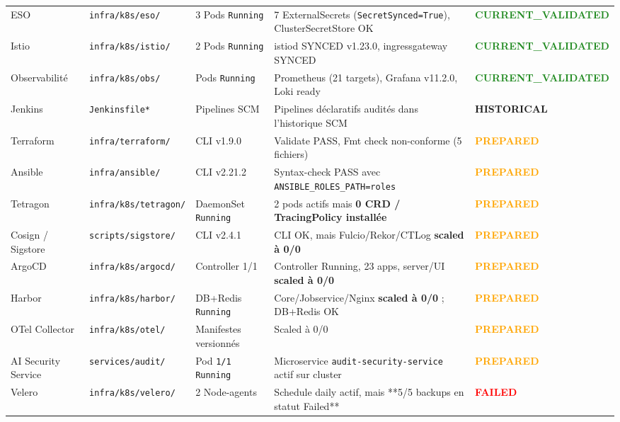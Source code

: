\begin{table}[H]
\begin{tabular}{@{}p{2.6cm}p{2.2cm}p{2.2cm}p{4.8cm}p{2.0cm}@{}}
ESO & \texttt{infra/k8s/eso/} & 3 Pods \texttt{Running} & 7 ExternalSecrets (\texttt{SecretSynced=True}), ClusterSecretStore OK & \textcolor{ForestGreen}{\textbf{CURRENT\_VALIDATED}} \\
Istio & \texttt{infra/k8s/istio/} & 2 Pods \texttt{Running} & istiod SYNCED v1.23.0, ingressgateway SYNCED & \textcolor{ForestGreen}{\textbf{CURRENT\_VALIDATED}} \\
Observabilité & \texttt{infra/k8s/obs/} & Pods \texttt{Running} & Prometheus (21 targets), Grafana v11.2.0, Loki ready & \textcolor{ForestGreen}{\textbf{CURRENT\_VALIDATED}} \\
\midrule
Jenkins & \texttt{Jenkinsfile*} & Pipelines SCM & Pipelines déclaratifs audités dans l'historique SCM & \textcolor{NavyBlue}{\textbf{HISTORICAL}} \\
\midrule
Terraform & \texttt{infra/terraform/} & CLI v1.9.0 & Validate PASS, Fmt check non-conforme (5 fichiers) & \textcolor{orange}{\textbf{PREPARED}} \\
Ansible & \texttt{infra/ansible/} & CLI v2.21.2 & Syntax-check PASS avec \texttt{ANSIBLE\_ROLES\_PATH=roles} & \textcolor{orange}{\textbf{PREPARED}} \\
Tetragon & \texttt{infra/k8s/tetragon/} & DaemonSet \texttt{Running} & 2 pods actifs mais \textbf{0 CRD / TracingPolicy installée} & \textcolor{orange}{\textbf{PREPARED}} \\
Cosign / Sigstore & \texttt{scripts/sigstore/} & CLI v2.4.1 & CLI OK, mais Fulcio/Rekor/CTLog \textbf{scaled à 0/0} & \textcolor{orange}{\textbf{PREPARED}} \\
ArgoCD & \texttt{infra/k8s/argocd/} & Controller 1/1 & Controller Running, 23 apps, server/UI \textbf{scaled à 0/0} & \textcolor{orange}{\textbf{PREPARED}} \\
Harbor & \texttt{infra/k8s/harbor/} & DB+Redis \texttt{Running} & Core/Jobservice/Nginx \textbf{scaled à 0/0} ; DB+Redis OK & \textcolor{orange}{\textbf{PREPARED}} \\
OTel Collector & \texttt{infra/k8s/otel/} & Manifestes versionnés & Scaled à 0/0 & \textcolor{orange}{\textbf{PREPARED}} \\
AI Security Service & \texttt{services/audit/} & Pod \texttt{1/1 Running} & Microservice \texttt{audit-security-service} actif sur cluster & \textcolor{orange}{\textbf{PREPARED}} \\
\midrule
Velero & \texttt{infra/k8s/velero/} & 2 Node-agents & Schedule daily actif, mais **5/5 backups en statut Failed** & \textcolor{red}{\textbf{FAILED}} \\

\end{tabular}
\end{table}
